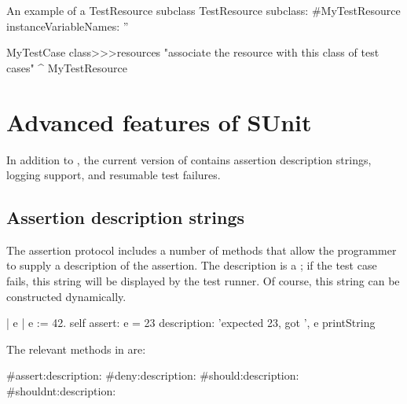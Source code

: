 \documentclass[a4paper,10pt,twoside]{book}
\begin{document}
\begin{classdef}[mytestresource]{An example of a TestResource subclass}
TestResource subclass: #MyTestResource
	instanceVariableNames: ''

MyTestCase class>>>resources
	"associate the resource with this class of test cases"
	^{ MyTestResource }
\end{classdef}






\section{Advanced features of SUnit}
In addition to , the current version of \sunit contains assertion
description strings, logging support, and resumable test failures.

\subsection{Assertion description strings}
\label{sec:descriptionStrings}

The  assertion protocol includes a
number of methods that allow the programmer to supply a description of the assertion.  The description is a ; if the test case
fails, this string will be displayed by the test runner.  Of
course, this string can be constructed dynamically.
\begin{code}{}
| e |
e := 42.
self assert: e = 23
	description: 'expected 23, got ', e printString
\end{code}

The relevant methods in  are:
\begin{code}{}
#assert:description:
#deny:description:
#should:description:
#shouldnt:description:
\end{code}
\end{document}
